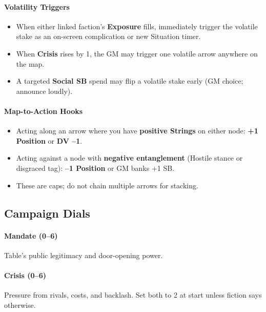 \documentclass[11pt]{article}
\begin{document}
\paragraph{Volatility Triggers}
\begin{itemize}
  \item When either linked faction's \textbf{Exposure} fills, immediately trigger the volatile stake as an on-screen complication or new Situation timer.
  \item When \textbf{Crisis} rises by 1, the GM may trigger one volatile arrow anywhere on the map.
  \item A targeted \textbf{Social SB} spend may flip a volatile stake early (GM choice; announce loudly).
\end{itemize}

\paragraph{Map-to-Action Hooks}
\begin{itemize}
  \item Acting along an arrow where you have \textbf{positive Strings} on either node: \textbf{+1 Position} or \textbf{DV --1}.
  \item Acting against a node with \textbf{negative entanglement} (Hostile stance or disgraced tag): \textbf{--1 Position} or GM banks +1 SB.
  \item These are caps; do not chain multiple arrows for stacking.
\end{itemize}

\subsection{Campaign Dials}
\paragraph{Mandate (0--6)} Table's public legitimacy and door-opening power.
\paragraph{Crisis (0--6)} Pressure from rivals, costs, and backlash.
Set both to 2 at start unless fiction says otherwise.
\end{document}
